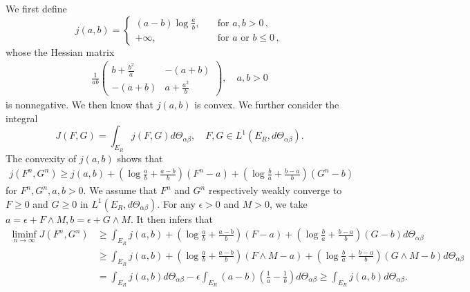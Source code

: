 \documentclass[reqno,11pt]{amsart}
\numberwithin{equation}{section}
\begin{document}
We first define 
\begin{equation*}
j(a,b)=\left\{\begin{array}{rl}
	(a-b) \log \frac{a}{b}, & \quad \text{for } a, b>0 \,, \\
	+\infty, & \quad \text{for } a \text { or } b \leq 0 \,,
\end{array}\right.
\end{equation*}
whose the Hessian matrix 
\begin{equation*}
\begin{aligned}
\tfrac{1}{ab} 
\begin{pmatrix}
	b+\frac{b^2}{a}  &  -(a+b)\\
	-(a+b)   &  a+\frac{a^2}{b} 
\end{pmatrix}, 
\quad a,b>0
\end{aligned}
\end{equation*}
is nonnegative. We then know that $j(a,b)$ is convex. We further consider the integral 
\begin{equation}
J(F,G)=\int_{E_R}j(F,G)d \Theta_{\alpha \beta }, \quad F,G \in L^1(E_R,d \Theta_{\alpha \beta}).
\end{equation}
The convexity of $j (a, b)$ shows that
\begin{equation*}
\begin{aligned}
j(F^n,G^n)\geq j(a,b)+(\log \frac{a}{b}+\frac{a-b}{b})(F^n-a)+(\log \frac{b}{a}+\frac{b-a}{b})(G^n-b) 
\end{aligned}
\end{equation*}
for $F^n,G^n,a,b>0$. We assume that $F^n$ and $G^n$ respectively weakly converge to $F \geq 0$ and $G\geq 0$ in $L^1(E_R,d \Theta_{\alpha \beta })$. For any $\epsilon>0$ and $M > 0$, we take $a=\epsilon +F\wedge M, b=\epsilon +G\wedge M$. It then infers that
\begin{equation*}
\begin{aligned}
\liminf \limits_{n\rightarrow \infty} J(F^n,G^n) 
&\geq \int_{E_R} j(a,b)+(\log \tfrac{a}{b}+\tfrac{a-b}{b})(F-a)+(\log \tfrac{b}{a}+\tfrac{b-a}{b})(G-b) d\Theta_{\alpha \beta}\\
&\geq \int_{E_R} j(a,b)+(\log \tfrac{a}{b}+\tfrac{a-b}{b})(F\wedge M-a)+(\log \tfrac{b}{a}+\tfrac{b-a}{b})(G\wedge M-b) d\Theta_{\alpha \beta}\\
&= \int_{E_R} j(a,b) d \Theta_{\alpha \beta} -\epsilon \int_{E_R} (a-b)(\tfrac{1}{a}-\tfrac{1}{b})d\Theta_{\alpha \beta} \geq \int_{E_R} j(a,b) d\Theta_{\alpha \beta}.
\end{aligned}
\end{equation*}
\end{document}
